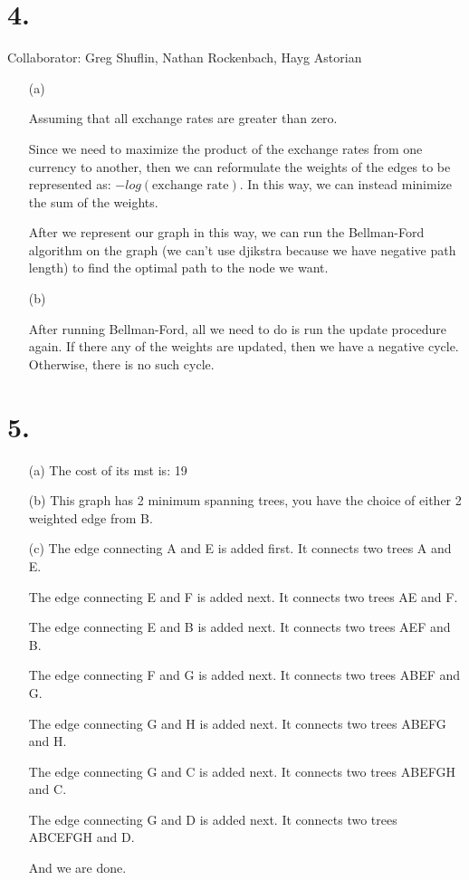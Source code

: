 \documentclass[11pt]{article}
\begin{document}
\section*{4.}
Collaborator: Greg Shuflin, Nathan Rockenbach, Hayg Astorian
\begin{itemize}
\item[(a)] 

Assuming that all exchange rates are greater than zero. 

Since we need to maximize the product of the exchange rates from one
currency to another, then we can reformulate the weights of the edges to be
represented as: $-log(\text{exchange rate})$. In this way, we can instead
minimize the sum of the weights.

After we represent our graph in this way, we can run the Bellman-Ford algorithm
on the graph (we can't use djikstra because we have negative path length) to
find the optimal path to the node we want. 

\item[(b)]

After running Bellman-Ford, all we need to do is run the update procedure
again. If there any of the weights are updated, then we have a negative cycle.
Otherwise, there is no such cycle.
\end{itemize}

\newpage
\section*{5.}

\begin{itemize}
\item[(a)]
The cost of its mst is: 19
\item[(b)]
This graph has 2 minimum spanning trees, you have the choice of either 2
weighted edge from B.
\item[(c)]
The edge connecting A and E is added first. It connects two trees A and E.

The edge connecting E and F is added next. It connects two trees AE and F.

The edge connecting E and B is added next. It connects two trees AEF and B.

The edge connecting F and G is added next. It connects two trees ABEF and G.

The edge connecting G and H is added next. It connects two trees ABEFG and H.

The edge connecting G and C is added next. It connects two trees ABEFGH and C.

The edge connecting G and D is added next. It connects two trees ABCEFGH and D.

And we are done.

\end{itemize}
\end{document}
